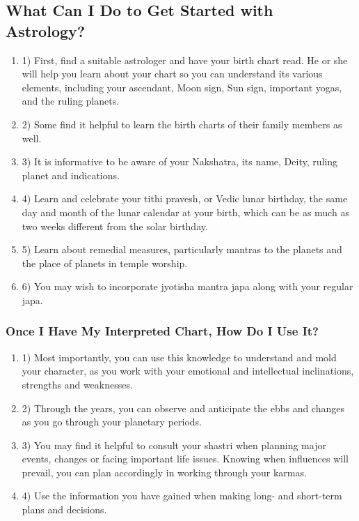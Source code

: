  

\subsection{What Can I Do to Get Started with Astrology?}
 
\begin{enumerate}
\item[] 1) First, find a suitable astrologer and have your birth chart read. He or she will help you learn about your chart so you can understand its various elements, including your ascendant, Moon sign, Sun sign, important yogas, and the ruling planets.

\item[] 2) Some find it helpful to learn the birth charts of their family members as well.

\item[] 3) It is informative to be aware of your Nakshatra, its name, Deity, ruling planet and indications.

\item[] 4) Learn and celebrate your tithi pravesh, or Vedic lunar birthday, the same day and month of the lunar calendar at your birth, which can be as much as two weeks different from the solar birthday.

\item[] 5) Learn about remedial measures, particularly mantras to the planets and the place of planets in temple worship.

\item[] 6) You may wish to incorporate jyotisha mantra japa along with your regular japa.
\end{enumerate}
 

\subsubsection{Once I Have My Interpreted Chart, How Do I Use It?}
 
 
\begin{enumerate}
\item[] 1) Most importantly, you can use this knowledge to understand and mold your character, as you work with your emotional and intellectual inclinations, strengths and weaknesses.

\item[] 2) Through the years, you can observe and anticipate the ebbs and changes as you go through your planetary periods.

\item[] 3) You may find it helpful to consult your shastri when planning major events, changes or facing important life issues. Knowing when influences will prevail, you can plan accordingly in working through your karmas.

\item[] 4) Use the information you have gained when making long- and short-term plans and decisions.
\end{enumerate}
 

